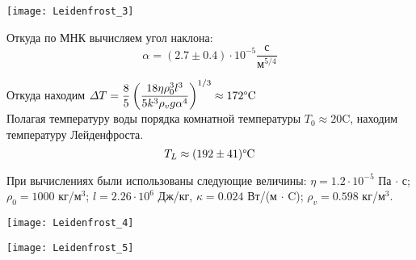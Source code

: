 \documentclass[14 pt]{extreport}
\def\cd{\cdot}
\begin{document}
 	
 	\begin{center}
 		\texttt{[image: Leidenfrost\_3]}
 	\end{center}
 	
 	
 	
 	
 	
 	Откуда по МНК вычисляем угол наклона:
 	\[\alpha = (2.7 \pm 0.4) \cd 10^{-5} \dfrac{\text{с}}{\text{м}^{5/4}}\]
 	
 	Откуда находим $ \varDelta T = \dfrac{8}{5}\left( \dfrac{18\eta \rho_{0}^{3}l^{3}}{5k^{3}\rho_{v} g \alpha^{4}} \right)^{1/3} \approx 172 \text{\textdegree C}  $\\
 	
 	Полагая температуру воды порядка комнатной температуры $ T_0 \approx 20 $\textdegree C, находим температуру Лейденфроста.
 	\[T_{L} \approx (192 \pm 41)\text{\textdegree C} \]
 	
 	При вычислениях были использованы следующие величины: $ \eta = 1.2 \cd 10^{-5} $ Па $ \cd $ с; $ \rho_{0} = 1000 $ кг/м$^{3}$; $ l = 2.26 \cd 10^{6} $ Дж/кг, $ \kappa = 0.024 $ Вт/(м $ \cd $ \textdegree C); $\rho_{v} = 0.598$ кг/м$ ^{3} $. 
 	
 	\begin{center}
 		\texttt{[image: Leidenfrost\_4]}
 	\end{center}
 	
 	\begin{center}
 		\texttt{[image: Leidenfrost\_5]}
 	\end{center}
 	
 	
 	
 	
	 
	
	
	
	
	
	
	
	
	
\end{document}
